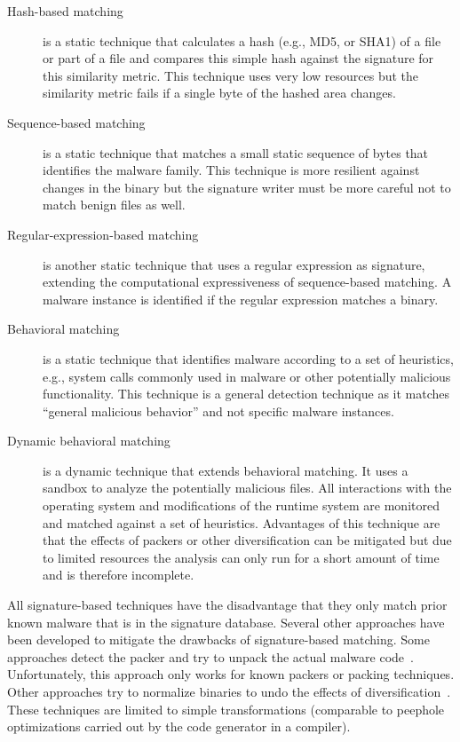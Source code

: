 \documentclass[10pt, preprint]{sigplanconf}
\begin{document}
\begin{description}
\item[Hash-based matching] is a static technique that calculates a hash (e.g.,
MD5, or SHA1) of a file or part of a file and compares this simple hash against
the signature for this similarity metric. This technique uses very low
resources but the similarity metric fails if a single byte of the hashed
area changes.

\item[Sequence-based matching] is a static technique that matches a small
static sequence of bytes that identifies the malware family. This technique is
more resilient against changes in the binary but the signature writer must be
more careful not to match benign files as well.

\item[Regular-expression-based matching] is another static technique that
uses a regular expression as signature, extending the computational
expressiveness of sequence-based matching. A malware instance is identified if
the regular expression matches a binary.

\item[Behavioral matching] is a static technique that identifies malware
according to a set of heuristics, e.g., system calls commonly used in malware
or other potentially malicious functionality. This technique is a general
detection technique as it matches ``general malicious behavior'' and not
specific malware instances.

\item[Dynamic behavioral matching] is a dynamic technique that extends
behavioral matching. It uses a sandbox to analyze the potentially malicious
files. All interactions with the operating system and modifications of the
runtime system are monitored and matched against a set of heuristics.
Advantages of this technique are that the effects of packers or other
diversification can be mitigated but due to limited resources the analysis can
only run for a short amount of time and is therefore incomplete.

\end{description}

All signature-based techniques have the disadvantage that they only match
prior known malware that is in the signature database. Several other approaches
have been developed to mitigate the drawbacks of signature-based matching. Some
approaches detect the packer and try to unpack the actual malware
code~\cite{kang07worm, martignoni07acsac, perdisci08patternrec, royal06acsac}.
Unfortunately, this approach only works for known packers or packing
techniques. Other approaches try to normalize binaries to undo the effects of
diversification~\cite{christodorescu05malwarenormalization}. These techniques
are limited to simple transformations (comparable to peephole optimizations
carried out by the code generator in a compiler).
\end{document}
